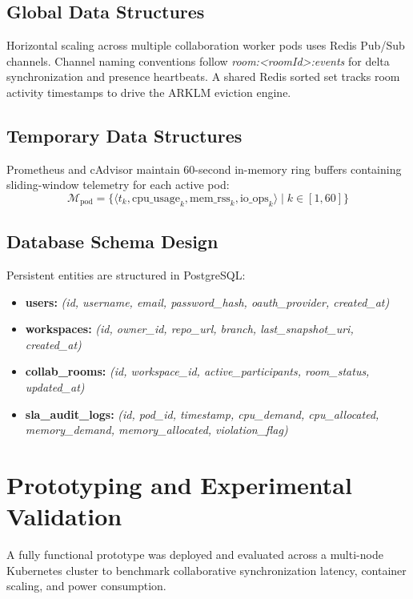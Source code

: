 \documentclass[12pt,a4paper]{report}
\begin{document}
	\subsection{Global Data Structures}
	Horizontal scaling across multiple collaboration worker pods uses Redis Pub/Sub channels. Channel naming conventions follow \textit{room:<roomId>:events} for delta synchronization and presence heartbeats. A shared Redis sorted set tracks room activity timestamps to drive the ARKLM eviction engine.
	
	\subsection{Temporary Data Structures}
	Prometheus and cAdvisor maintain 60-second in-memory ring buffers containing sliding-window telemetry for each active pod:
	\begin{equation}
		\mathcal{M}_{\text{pod}} = \{\langle t_k, \text{cpu\_usage}_k, \text{mem\_rss}_k, \text{io\_ops}_k \rangle \mid k \in [1, 60]\}
	\end{equation}
	
	\subsection{Database Schema Design}
	Persistent entities are structured in PostgreSQL:
	\begin{itemize}
		\item \textbf{users:} \textit{(id, username, email, password\allowbreak\_hash, oauth\allowbreak\_provider, created\allowbreak\_at)}
		\item \textbf{workspaces:} \textit{(id, owner\allowbreak\_id, repo\allowbreak\_url, branch, last\allowbreak\_snapshot\allowbreak\_uri, created\allowbreak\_at)}
		\item \textbf{collab\_rooms:} \textit{(id, workspace\allowbreak\_id, active\allowbreak\_participants, room\allowbreak\_status, updated\allowbreak\_at)}
		\item \textbf{sla\_audit\_logs:} \textit{(id, pod\allowbreak\_id, timestamp, cpu\allowbreak\_demand, cpu\allowbreak\_allocated, memory\allowbreak\_demand, memory\allowbreak\_allocated, violation\allowbreak\_flag)}
	\end{itemize}
	
	\section{Prototyping and Experimental Validation}
	A fully functional prototype was deployed and evaluated across a multi-node Kubernetes cluster to benchmark collaborative synchronization latency, container scaling, and power consumption.
	
\end{document}
